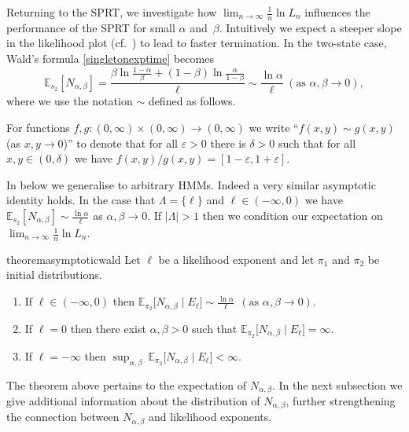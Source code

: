 \documentclass[a4paper,UKenglish,cleveref, autoref,mathscr]{lipics-v2019}
\newcommand{\EE}{\mathbb{E}}
\newcommand{\1}{\mathbbm{1}}
\newcommand{\liexp}{\lim_{n\rightarrow\infty} \frac1n \ln L_n}
\renewcommand{\epsilon}{\varepsilon}
\newcommand{\stefan}[1]{\marginpar{\textcolor{blue}{#1}}}
\renewcommand{\stefan}[1]{}
\begin{document}
Returning to the SPRT, we investigate how $\liexp$ influences the performance of the SPRT for small $\alpha$ and~$\beta$.
Intuitively we expect a steeper slope in the likelihood plot (cf.~) to lead to faster termination.
In the two-state case, Wald's formula \eqref{singletonexptime} becomes%
\begin{equation}\label{asymptoticwaldeq}
\EE_{s_2}[N_{\alpha, \beta}] = \frac{\beta \ln \frac{1 - \alpha}{\beta} + (1 - \beta) \ln \frac{\alpha}{1 - \beta}}{\ell} \sim \frac{\ln \alpha}{\ell} \ (\text{as } \alpha, \beta \rightarrow 0),
\end{equation}
where we use the notation $\sim$ defined as follows.
\stefan{Please check. Perhaps move.}
For functions $f,g : (0,\infty) \times (0, \infty) \to (0,\infty)$ we write ``$f(x,y) \sim g(x,y)$ (as $x,y \to 0$)'' to denote that for all $\epsilon > 0$ there is $\delta > 0$ such that for all $x,y \in (0,\delta)$ we have $f(x,y)/g(x,y) = [1-\epsilon,1+\epsilon]$.

In  below we generalise  to arbitrary HMMs.
Indeed a very similar asymptotic identity holds.
In the case that $\Lambda = \{\ell\}$ and $\ell \in (-\infty, 0)$ we have $\EE_{s_2}[N_{\alpha, \beta}] \sim \frac{\ln \alpha}{\ell}$ as $\alpha, \beta \rightarrow 0$.
If $|\Lambda| > 1$ then we condition our expectation on $\liexp$.
\begin{restatable}{theorem}{asymptoticwald}\label{asymptoticwald}
Let $\ell$ be a likelihood exponent and let $\pi_1$ and $\pi_2$ be initial distributions.
\begin{enumerate}
\item If $\ell \in (-\infty, 0)$ then
$\displaystyle
\EE_{\pi_2} \big[ N_{\alpha,\beta} \mid E_{\ell}\big] \sim \frac{\ln \alpha}{\ell} \ \ (\text{as } \alpha, \beta \rightarrow 0)
$.
\item If $\ell = 0$ then there exist $\alpha, \beta > 0$ such that
$\displaystyle
\EE_{\pi_2} \big[ N_{\alpha,\beta} \mid E_\ell\big] = \infty
$.
\item If $\ell = -\infty$ then
$\displaystyle
\sup_{\alpha, \beta}~\EE_{\pi_2} \big[ N_{\alpha,\beta} \mid E_\ell \big] < \infty
$.
\end{enumerate}
\end{restatable}

The theorem above pertains to the expectation of $N_{\alpha, \beta}$.
In the next subsection we give additional information about the distribution of $N_{\alpha, \beta}$, further strengthening the connection between $N_{\alpha, \beta}$ and likelihood exponents.
\end{document}
